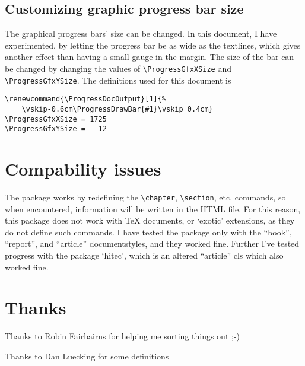 \documentclass{article}
\begin{document}
\subsection{Customizing graphic progress bar size}
The graphical progress bars' size can be changed. In this document, I have experimented, by letting the progress bar be as wide as the textlines, which gives another effect than having a small gauge in the margin. The size of the bar can be changed by changing the values of  \verb|\ProgressGfxXSize|  and  \verb|\ProgressGfxYSize|.
The definitions used for this document is

\begin{verbatim}
\renewcommand{\ProgressDocOutput}[1]{%
    \vskip-0.6cm\ProgressDrawBar{#1}\vskip 0.4cm}
\ProgressGfxXSize = 1725
\ProgressGfxYSize =   12
\end{verbatim}





\section{Compability issues}

The package works by redefining the \verb|\chapter|,  \verb|\section|, etc. commands, so when encountered, information will be written in the HTML file. For this reason, this package does not work with \TeX{} documents, or `exotic' extensions, as they do not define such commands. I have tested the package only with the ``book'', ``report'', and ``article'' documentstyles, and they worked fine. Further I've tested progress with the package `hitec', which is an altered ``article'' cls which also worked fine.



\section{Thanks}

Thanks to Robin Fairbairns for helping me sorting things out ;-)

Thanks to Dan Luecking for some definitions
\end{document}
